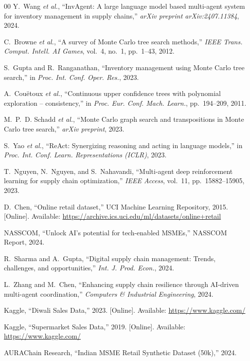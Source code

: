 \documentclass[conference]{IEEEtran}
\begin{document}
\begin{thebibliography}{00}
Y.~Wang \textit{et al.}, ``InvAgent: A large language model based multi-agent system for inventory management in supply chains,'' \textit{arXiv preprint arXiv:2407.11384}, 2024.

C.~Browne \textit{et al.}, ``A survey of Monte Carlo tree search methods,'' \textit{IEEE Trans. Comput. Intell. AI Games}, vol.~4, no.~1, pp.~1--43, 2012.

S.~Gupta and R.~Ranganathan, ``Inventory management using Monte Carlo tree search,'' in \textit{Proc. Int. Conf. Oper. Res.}, 2023.

A.~Couëtoux \textit{et al.}, ``Continuous upper confidence trees with polynomial exploration -- consistency,'' in \textit{Proc. Eur. Conf. Mach. Learn.}, pp.~194--209, 2011.

M.~P.~D. Schadd \textit{et al.}, ``Monte Carlo graph search and transpositions in Monte Carlo tree search,'' \textit{arXiv preprint}, 2023.

S.~Yao \textit{et al.}, ``ReAct: Synergizing reasoning and acting in language models,'' in \textit{Proc. Int. Conf. Learn. Representations (ICLR)}, 2023.

T.~Nguyen, N.~Nguyen, and S.~Nahavandi, ``Multi-agent deep reinforcement learning for supply chain optimization,'' \textit{IEEE Access}, vol.~11, pp.~15882--15905, 2023.

D.~Chen, ``Online retail dataset,'' UCI Machine Learning Repository, 2015. [Online]. Available: \url{https://archive.ics.uci.edu/ml/datasets/online+retail}

NASSCOM, ``Unlock AI's potential for tech-enabled MSMEs,'' NASSCOM Report, 2024.

R.~Sharma and A.~Gupta, ``Digital supply chain management: Trends, challenges, and opportunities,'' \textit{Int. J. Prod. Econ.}, 2024.

L.~Zhang and M.~Chen, ``Enhancing supply chain resilience through AI-driven multi-agent coordination,'' \textit{Computers \& Industrial Engineering}, 2024.

Kaggle, ``Diwali Sales Data,'' 2023. [Online]. Available: \url{https://www.kaggle.com/}

Kaggle, ``Supermarket Sales Data,'' 2019. [Online]. Available: \url{https://www.kaggle.com/}

AURAChain Research, ``Indian MSME Retail Synthetic Dataset (50k),'' 2024.

\end{thebibliography}
\end{document}
